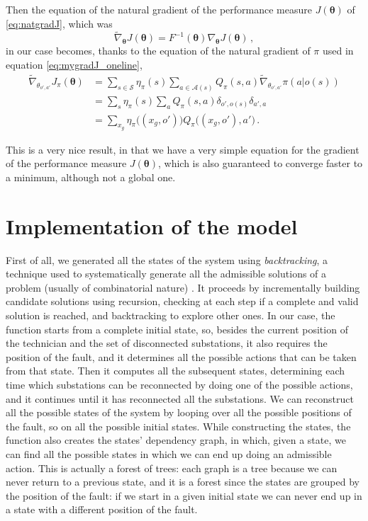 Then the equation of the natural gradient of the performance measure $J(\boldsymbol \theta)$ of \eqref{eq:natgradJ}, which was
\begin{equation*}
    \widetilde \nabla_{\boldsymbol \theta} J(\boldsymbol \theta) = F^{-1}(\boldsymbol \theta) \nabla_{\boldsymbol \theta} J(\boldsymbol \theta) \, ,
\end{equation*}
in our case becomes, thanks to the equation of the natural gradient of $\pi$ used in equation \eqref{eq:mygradJ_oneline},
\begin{equation}
    \begin{aligned}
        \widetilde \nabla_{\theta_{o',a'}} J_\pi (\boldsymbol \theta)
        &= \sum_{s \in \mathcal S} \eta_\pi(s) \sum_{a \in \mathcal A(s)} Q_\pi(s,a) \widetilde \nabla_{\theta_{o',a'}} \pi(a|o(s)) \\
        &= \sum_s \eta_\pi(s) \sum_a Q_\pi(s,a) \delta_{o', o(s)} \delta_{a',a} \\
        &= \sum_{x_g} \eta_\pi \big((x_g, o') \big) Q_\pi \big((x_g, o'), a' \big)\, .
    \end{aligned}
    \label{eq:mynatgradJ}
\end{equation}

This is a very nice result, in that we have a very simple equation for the gradient of the performance measure $J(\boldsymbol \theta)$, which is also guaranteed to converge faster to a minimum, although not a global one.


\section{Implementation of the model}
\label{sec:model-implementation}

First of all, we generated all the states of the system using \emph{backtracking}, a technique used to systematically generate all the admissible solutions of a problem (usually of combinatorial nature) \cite{Montresor2014}. It proceeds by incrementally building candidate solutions using recursion, checking at each step if a complete and valid solution is reached, and backtracking to explore other ones. In our case, the function starts from a complete initial state, so, besides the current position of the technician and the set of disconnected substations, it also requires the position of the fault, and it determines all the possible actions that can be taken from that state. Then it computes all the subsequent states, determining each time which substations can be reconnected by doing one of the possible actions, and it continues until it has reconnected all the substations. We can reconstruct all the possible states of the system by looping over all the possible positions of the fault, so on all the possible initial states. While constructing the states, the function also creates the states' dependency graph, in which, given a state, we can find all the possible states in which we can end up doing an admissible action. This is actually a forest of trees: each graph is a tree because we can never return to a previous state, and it is a forest since the states are grouped by the position of the fault: if we start in a given initial state we can never end up in a state with a different position of the fault.

